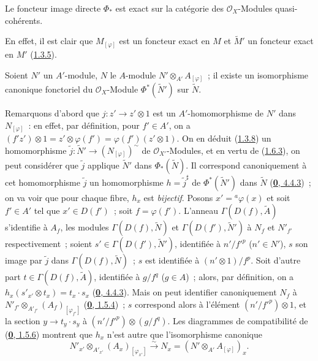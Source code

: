 \begin{corollary}[1.6.4]
\label{I.1.6.4-fr}
Le foncteur image directe $\Phi_*$ est exact sur la catégorie des
$\mathscr{O}_X$-Modules quasi-cohérents.
\end{corollary}

En effet, il est clair que $M_{[\varphi]}$ est un foncteur exact en $M$ et
$\widetilde{M}'$ un foncteur exact en $M'$ (\hyperref[I.1.3.5-fr]{1.3.5}).

\begin{proposition}[1.6.5]
\label{I.1.6.5-fr}
Soient $N'$ un $A'$-module, $N$ le $A$-module
$N'\otimes_{A'}A_{[\varphi]}$~; il existe un isomorphisme canonique
fonctoriel du $\mathscr{O}_X$-Module $\Phi^*(\widetilde{N}')$ sur
$\widetilde{N}$.
\end{proposition}

Remarquons d'abord que $j:z'\to z'\otimes 1$ est un
$A'$-homomorphisme de $N'$ dans $N_{[\varphi]}$~: en effet, par définition,
pour $f'\in A'$, on a
$(f'z')\otimes 1=z'\otimes\varphi(f')=\varphi(f')(z'\otimes 1)$. On en
déduit (\hyperref[I.1.3.8-fr]{1.3.8}) un homomorphisme
$\widetilde{j}:\widetilde{N}'\to(N_{[\varphi]})^{\sim}$ de
$\mathscr{O}_{X'}$-Modules, et en vertu de
(\hyperref[I.1.6.3-fr]{1.6.3}), on peut considérer que $\widetilde{j}$
applique $\widetilde{N}'$ dans $\Phi_*(\widetilde{N})$. Il correspond
canoniquement à cet homomorphisme $\widetilde{j}$ un homomorphisme
$h=\widetilde{j}^{\sharp}$ de $\Phi^*(\widetilde{N}')$ dans $\widetilde{N}$
(\hyperref[0.4.4.3-fr]{\textbf{0}, 4.4.3})~; on va voir que pour chaque fibre,
$h_x$ est \emph{bijectif}. Posons $x'={}^a\varphi(x)$ et soit $f'\in A'$
tel que $x'\in D(f')$~; soit $f=\varphi(f')$. L'anneau
$\Gamma(D(f),\widetilde{A})$ s'identifie à $A_f$, les modules
$\Gamma(D(f),\widetilde{N})$ et $\Gamma(D(f'),\widetilde{N}')$ à $N_f$ et
$N'_{f'}$ respectivement~; soient
$s'\in\Gamma(D(f'),\widetilde{N}')$, identifiée à $n'/{f'}^p$ ($n'\in N'$),
$s$ son image par $\widetilde{j}$ dans $\Gamma(D(f),\widetilde{N})$~; $s$
est identifiée à $(n'\otimes 1)/f^p$. Soit d'autre part
$t\in\Gamma(D(f),\widetilde{A})$, identifiée à $g/f^q$ ($g\in A$)~; alors,
par définition, on a
$h_x(s'_{x'}\otimes t_x)=t_x\cdot s_x$
(\hyperref[0.4.4.3-fr]{\textbf{0}, 4.4.3}). Mais on peut identifier canoniquement
$N_f$ à
$N'_{f'}\otimes_{A'_{f'}}(A_f)_{[\varphi_{f'}]}$
(\hyperref[0.1.5.4-fr]{\textbf{0}, 1.5.4})~; $s$ correspond alors à l'élément
$(n'/{f'}^p)\otimes 1$, et la section $y\to t_y\cdot s_y$ à
$(n'/{f'}^p)\otimes(g/f^q)$. Les diagrammes de compatibilité de
(\hyperref[0.1.5.6-fr]{\textbf{0}, 1.5.6}) montrent que $h_x$ n'est autre que
l'isomorphisme canonique
\[
  \label{I.1.6.5.1-fr}
  N'_{x'}\otimes_{A'_{x'}}(A_x)_{[\varphi_{x'}]}
  \xrightarrow{\sim}N_x=(N'\otimes_{A'}A_{[\varphi]})_x.
  \tag{1.6.5.1}
\]

